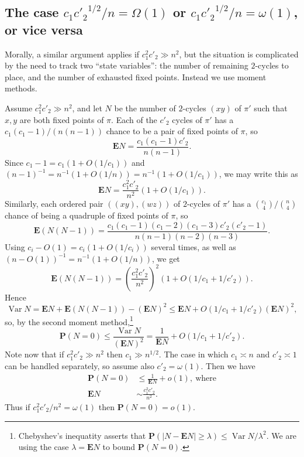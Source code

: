 \documentclass[ALCO,ThmDefs,Unicode,epreuves]{cedram}
\DeclareMathOperator{\Var}{Var}
\renewcommand\P{\mathbf{P}}
\newcommand\E{\mathbf{E}}
\newcommand\br[1]{\left({#1}\right)}
\newcommand\pfrac[2]{\br{\frac{#1}{#2}}}
\begin{document}
\subsection{The case \texorpdfstring{$c_1 {c'_2}^{1/2}/n = \Omega(1)$}{c1 c2'\textasciicircum{1/2} / n = Omega(1)} or \texorpdfstring{$c_1 {c'_2}^{1/2}/n = \omega(1)$}{c1 c2'\textasciicircum{1/2} / n = omega(1)}, or vice versa} \label{subsec:c1c2}

Morally, a similar argument applies if $c_1^2 c'_2 \gg n^2$, but the situation is complicated by the need to track two ``state variables'': the number of remaining $2$-cycles to place, and the number of exhausted fixed points. Instead we use moment methods.

Assume $c_1^2 c'_2 \gg n^2$, and let $N$ be the number of $2$-cycles $(xy)$ of $\pi'$ such that $x,y$ are both fixed points of $\pi$.
Each of the $c'_2$ cycles of $\pi'$ has a $c_1(c_1-1)/(n(n-1))$ chance to be a pair of fixed points of $\pi$, so
\[
\E N
= \frac{c_1(c_1-1)c'_2}{n(n-1)}.
\]
Since $c_1-1 = c_1(1 + O(1/c_1))$ and $(n-1)^{-1} = n^{-1}(1 + O(1/n)) = n^{-1} (1 + O(1/c_1))$,
we may write this as
\[
\E N = \frac {c_1^2 c'_2}{n^2}(1+O(1/c_1)).
\]
Similarly, each ordered pair $((xy),(wz))$ of $2$-cycles of $\pi'$ has a $\binom{c_1}{4}/\binom{n}{4}$ chance of being a quadruple of fixed points of $\pi$, so
\[
 \E(N(N-1))
 = \frac{c_1(c_1-1)(c_1-2)(c_1-3)c'_2(c'_2-1)}{n(n-1)(n-2)(n-3)}.
\]
Using $c_i - O(1) = c_i(1 + O(1/c_i))$ several times,
as well as $(n - O(1))^{-1} = n^{-1}(1 + O(1/n))$,
we get
\[
 \E(N(N-1)) = \pfrac{c_1^2 c'_2}{n^2}^2 (1 + O(1/c_1 + 1/c'_2)).
\]
Hence
\[
 \Var N = \E N + \E(N(N-1)) - (\E N)^2 \leq \E N + O(1/c_1 + 1/c'_2) (\E N)^2,
\]
so, by the second moment method,\footnote{Chebyshev's inequatity asserts that $\P(|N - \E N| \geq \lambda) \leq \Var N / \lambda^2$. We are using the case $\lambda = \E N$ to bound $\P(N=0)$.}
\[
 \P(N=0) \leq \frac{\Var N}{(\E N)^2} = \frac1{\E N} + O(1/c_1 + 1/c'_2).
\]
Note now that if $c_1^2 c'_2 \gg n^2$ then $c_1 \gg n^{1/2}$. The case in which $c_1 \asymp n$ and $c'_2 \asymp 1$ can be handled separately, so assume also $c'_2 = \omega(1)$. Then we have
\begin{align*}
 \P(N=0) &\leq \frac1{\E N} + o(1),~\text{where}\\
 \E N &\sim \frac{c_1^2 c'_2}{n^2}.
\end{align*}
Thus if $c_1^2 c'_2 / n^2 = \omega(1)$ then $\P(N=0) = o(1)$.
\end{document}
